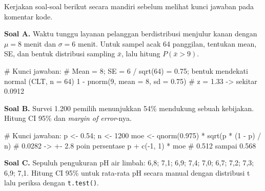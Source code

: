 \documentclass[
  indonesian,
  letterpaper,
]{book}
\newenvironment{Shaded}{\begin{snugshade}}{\end{snugshade}}
\newcommand{\AttributeTok}[1]{\textcolor[rgb]{0.40,0.45,0.13}{#1}}
\newcommand{\CommentTok}[1]{\textcolor[rgb]{0.37,0.37,0.37}{#1}}
\newcommand{\DecValTok}[1]{\textcolor[rgb]{0.68,0.00,0.00}{#1}}
\newcommand{\FloatTok}[1]{\textcolor[rgb]{0.68,0.00,0.00}{#1}}
\newcommand{\FunctionTok}[1]{\textcolor[rgb]{0.28,0.35,0.67}{#1}}
\newcommand{\NormalTok}[1]{\textcolor[rgb]{0.00,0.23,0.31}{#1}}
\newcommand{\OtherTok}[1]{\textcolor[rgb]{0.00,0.23,0.31}{#1}}
\newcommand{\SpecialCharTok}[1]{\textcolor[rgb]{0.37,0.37,0.37}{#1}}
\begin{document}
Kerjakan soal-soal berikut secara mandiri sebelum melihat kunci jawaban
pada komentar kode.

\textbf{Soal A.} Waktu tunggu layanan pelanggan berdistribusi menjulur
kanan dengan \(\mu = 8\) menit dan \(\sigma = 6\) menit. Untuk sampel
acak 64 panggilan, tentukan mean, SE, dan bentuk distribusi sampling
\(\bar{x}\), lalu hitung \(P(\bar{x} > 9)\).

\begin{Shaded}
\begin{Highlighting}[]
\CommentTok{\# Kunci jawaban:}
\CommentTok{\# Mean = 8; SE = 6 / sqrt(64) = 0.75; bentuk mendekati normal (CLT, n = 64)}
\DecValTok{1} \SpecialCharTok{{-}} \FunctionTok{pnorm}\NormalTok{(}\DecValTok{9}\NormalTok{, }\AttributeTok{mean =} \DecValTok{8}\NormalTok{, }\AttributeTok{sd =} \FloatTok{0.75}\NormalTok{)   }\CommentTok{\# z = 1.33 {-}\textgreater{} sekitar 0.0912}
\end{Highlighting}
\end{Shaded}

\textbf{Soal B.} Survei 1.200 pemilih menunjukkan 54\% mendukung sebuah
kebijakan. Hitung CI 95\% dan \emph{margin of error}-nya.

\begin{Shaded}
\begin{Highlighting}[]
\CommentTok{\# Kunci jawaban:}
\NormalTok{p }\OtherTok{\textless{}{-}} \FloatTok{0.54}\NormalTok{; n }\OtherTok{\textless{}{-}} \DecValTok{1200}
\NormalTok{moe }\OtherTok{\textless{}{-}} \FunctionTok{qnorm}\NormalTok{(}\FloatTok{0.975}\NormalTok{) }\SpecialCharTok{*} \FunctionTok{sqrt}\NormalTok{(p }\SpecialCharTok{*}\NormalTok{ (}\DecValTok{1} \SpecialCharTok{{-}}\NormalTok{ p) }\SpecialCharTok{/}\NormalTok{ n)   }\CommentTok{\# 0.0282 {-}\textgreater{} +{-} 2.8 poin persentase}
\NormalTok{p }\SpecialCharTok{+} \FunctionTok{c}\NormalTok{(}\SpecialCharTok{{-}}\DecValTok{1}\NormalTok{, }\DecValTok{1}\NormalTok{) }\SpecialCharTok{*}\NormalTok{ moe                            }\CommentTok{\# 0.512 sampai 0.568}
\end{Highlighting}
\end{Shaded}

\textbf{Soal C.} Sepuluh pengukuran pH air limbah: 6,8; 7,1; 6,9; 7,4;
7,0; 6,7; 7,2; 7,3; 6,9; 7,1. Hitung CI 95\% untuk rata-rata pH secara
manual dengan distribusi t lalu periksa dengan \texttt{t.test()}.
\end{document}

